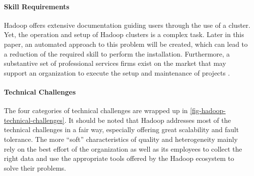 \paragraph{Skill Requirements}
Hadoop offers extensive documentation guiding users through the use of a cluster. Yet, the operation and setup of Hadoop clusters is a complex task. Later in this paper, an automated approach to this problem will be created, which can lead to a reduction of the required skill to perform the installation.
Furthermore, a substantive set of professional services firms exist on the market that may support an organization to execute the setup and maintenance of projects \autocite{hadoopconsulting}. 

\paragraph{Technical Challenges}
The four categories of technical challenges are wrapped up in \autoref{fig-hadoop-technical-challenges}. It should be noted that Hadoop addresses most of the technical challenges in a fair way, especially offering great scalability and fault tolerance. The more \enquote{soft} characteristics of quality and heterogeneity mainly rely on the best effort of the organization as well as its employees to collect the right data and use the appropriate tools offered by the Hadoop ecosystem to solve their problems.

